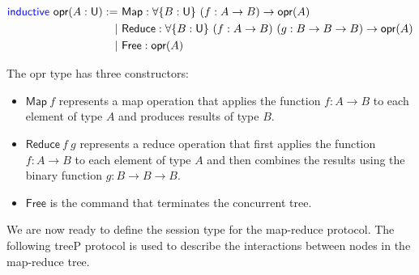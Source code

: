 \vspace{-1em}
\begingroup
\small
\addtolength{\jot}{-0.25em}
\begin{align*}
  \textsf{\color{blue}inductive}\ \textsf{opr}(A : \textsf{U}) :=\ &\textsf{Map}   : \forall \{B : \textsf{U}\}\ (f : A \rightarrow B) \rightarrow \textsf{opr}(A) \\
  \mid\ &\textsf{Reduce}: \forall \{B : \textsf{U}\}\ (f : A \rightarrow B)\ (g : B \rightarrow B \rightarrow B) \rightarrow \textsf{opr}(A) \\
  \mid\ &\textsf{Free}  : \textsf{opr}(A)
\end{align*}
\endgroup

The \textsf{opr} type has three constructors:
\begin{itemize}
  \item $\textsf{Map}\ f$ represents a map operation that applies the function
        $f : A \rightarrow B$ to each element of type $A$ and produces results of type $B$.
  \item $\textsf{Reduce}\ f\ g$ represents a reduce operation that first
        applies the function $f : A \rightarrow B$ to each element of type $A$ and then
        combines the results using the binary function $g : B \rightarrow B \rightarrow B$.
  \item $\textsf{Free}$ is the command that terminates the concurrent tree.
\end{itemize}

We are now ready to define the session type for the map-reduce protocol.
The following \textsf{treeP} protocol is used to describe the interactions between nodes
in the map-reduce tree.


